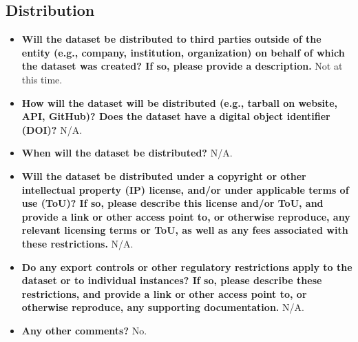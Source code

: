 \subsection{Distribution}
\begin{itemize}
    \item \textbf{Will the dataset be distributed to third parties outside of the entity (e.g., company, institution, organization) on behalf of which the dataset was created? If so, please provide a description.} Not at this time.
    \item \textbf{How will the dataset will be distributed (e.g., tarball on website, API, GitHub)? Does the dataset have a digital object identifier (DOI)?} N/A.
    \item \textbf{When will the dataset be distributed?} N/A.
    \item \textbf{Will the dataset be distributed under a copyright or other intellectual property (IP) license, and/or under applicable terms of use (ToU)? If so, please describe this license and/or ToU, and provide a link or other access point to, or otherwise reproduce, any relevant licensing terms or ToU, as well as any fees associated with these restrictions.} N/A.
    \item \textbf{Do any export controls or other regulatory restrictions apply to the dataset or to individual instances? If so, please describe these restrictions, and provide a link or other access point to, or otherwise reproduce, any supporting documentation.} N/A.
    \item \textbf{Any other comments?} No.
\end{itemize}


